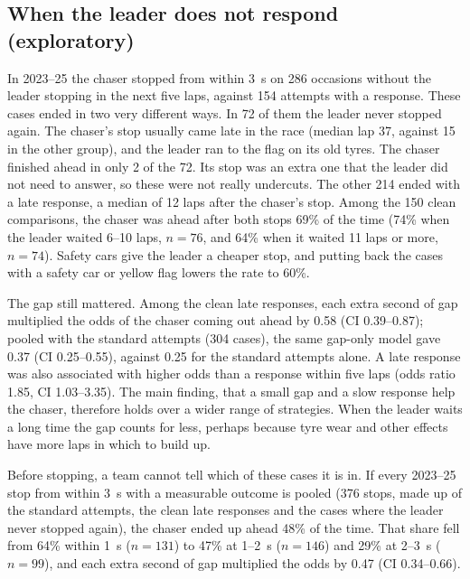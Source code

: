 \documentclass[12pt]{article}
\begin{document}
\subsection{When the leader does not respond (exploratory)}\label{sec:noresp}
In 2023--25 the chaser stopped from within 3~s on 286 occasions without the leader stopping in the next five laps, against 154 attempts with a response. These cases ended in two very different ways. In 72 of them the leader never stopped again. The chaser's stop usually came late in the race (median lap 37, against 15 in the other group), and the leader ran to the flag on its old tyres. The chaser finished ahead in only 2 of the 72. Its stop was an extra one that the leader did not need to answer, so these were not really undercuts. The other 214 ended with a late response, a median of 12 laps after the chaser's stop. Among the 150 clean comparisons, the chaser was ahead after both stops 69\% of the time (74\% when the leader waited 6--10 laps, $n=76$, and 64\% when it waited 11 laps or more, $n=74$). Safety cars give the leader a cheaper stop, and putting back the cases with a safety car or yellow flag lowers the rate to 60\%.

The gap still mattered. Among the clean late responses, each extra second of gap multiplied the odds of the chaser coming out ahead by 0.58 (CI 0.39--0.87); pooled with the standard attempts (304 cases), the same gap-only model gave 0.37 (CI 0.25--0.55), against 0.25 for the standard attempts alone. A late response was also associated with higher odds than a response within five laps (odds ratio 1.85, CI 1.03--3.35). The main finding, that a small gap and a slow response help the chaser, therefore holds over a wider range of strategies. When the leader waits a long time the gap counts for less, perhaps because tyre wear and other effects have more laps in which to build up.

Before stopping, a team cannot tell which of these cases it is in. If every 2023--25 stop from within 3~s with a measurable outcome is pooled (376 stops, made up of the standard attempts, the clean late responses and the cases where the leader never stopped again), the chaser ended up ahead 48\% of the time. That share fell from 64\% within 1~s ($n=131$) to 47\% at 1--2~s ($n=146$) and 29\% at 2--3~s ($n=99$), and each extra second of gap multiplied the odds by 0.47 (CI 0.34--0.66).
\end{document}
